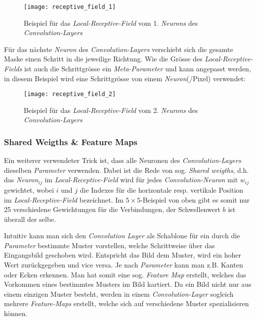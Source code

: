 \begin{figure}[h]
	\ContinuedFloat*
	\centering
	\texttt{[image: receptive\_field\_1]}
	\caption[Beispiel für das \textit{Local-Receptive-Field} 1. \textit{Neuron}]{Beispiel für das \textit{Local-Receptive-Field} vom 1. \textit{Neurons} des \textit{Convolution-Layers}}
	\label{img:rec_field1}
\end{figure}

Für das nächste \textit{Neuron} des \textit{Convolution-Layers} verschiebt sich die gesamte Maske einen Schritt in die jeweilige Richtung. Wie die Grösse des \textit{Local-Receptive-Fields} ist auch die Schrittgrösse ein \textit{Meta-Parameter} und kann angepasst werden, in diesem Beispiel wird eine Schrittgrösse von einem \textit{Neuron}(/Pixel) verwendet:

\begin{figure}[h]
	\ContinuedFloat
	\centering
	\texttt{[image: receptive\_field\_2]}
	\caption[Beispiel für das \textit{Local-Receptive-Field} 2. \textit{Neuron}]{Beispiel für das \textit{Local-Receptive-Field} vom 2. \textit{Neurons} des \textit{Convolution-Layers}}
	\label{img:rec_field2}
\end{figure}

\subsubsection{Shared Weigths \& Feature Maps}
Ein weiterer verwendeter Trick ist, dass alle Neuronen des \textit{Convolution-Layers} dieselben \textit{Parameter} verwenden. Dabei ist die Rede von sog. \textit{Shared weigths}, d.h. das \textit{Neuron}$_{ij}$ im \textit{Local-Receptive-Field} wird für jedes \textit{Convolution-Neuron} mit $w_{ij}$ gewichtet, wobei $i$ und $j$ die Indexes für die horizontale resp. vertikale Position im \textit{Local-Receptive-Field} bezeichnet. Im $5\times 5$-Beispiel von oben gibt es somit nur 25 verschiedene Gewichtungen für die Verbindungen, der Schwellenwert $b$ ist überall der selbe.

Intuitiv kann man sich den \textit{Convolution Layer} als Schablone für ein durch die \textit{Parameter} bestimmte Muster vorstellen, welche Schrittweise über das Eingangsbild geschoben wird. Entspricht das Bild dem Muster, wird ein hoher Wert zurückgegeben und vice versa. Je nach \textit{Parameter} kann man z.B. Kanten oder Ecken erkennen. Man hat somit eine sog. \textit{Feature Map} erstellt, welches das Vorkommen eines bestimmtes Musters im Bild kartiert. Da ein Bild nicht nur aus einem einzigen Muster besteht, werden in einem \textit{Convolution-Layer} sogleich mehrere \textit{Feature-Maps} erstellt, welche sich auf verschiedene Muster spezialisieren können.


